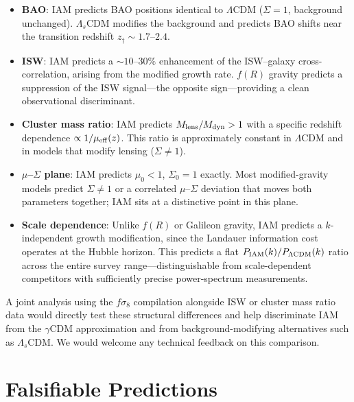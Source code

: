 \documentclass[12pt,a4paper]{article}
\begin{document}
\begin{itemize}
  \item \textbf{BAO}: IAM predicts BAO positions identical to $\Lambda$CDM
    ($\Sigma = 1$, background unchanged).
    $\Lambda_s$CDM modifies the background and predicts BAO shifts
    near the transition redshift $z_\dagger \sim 1.7$--$2.4$.

  \item \textbf{ISW}: IAM predicts a $\sim 10$--$30\%$ enhancement of the
    ISW--galaxy cross-correlation, arising from the modified growth rate.
    $f(R)$ gravity predicts a suppression of the ISW signal---the opposite
    sign---providing a clean observational discriminant.

  \item \textbf{Cluster mass ratio}: IAM predicts $M_{\rm lens}/M_{\rm dyn} > 1$
    with a specific redshift dependence $\propto 1/\mu_{\rm eff}(z)$.
    This ratio is approximately constant in $\Lambda$CDM and in models
    that modify lensing ($\Sigma \neq 1$).

  \item \textbf{$\mu$--$\Sigma$ plane}: IAM predicts $\mu_0 < 1$,
    $\Sigma_0 = 1$ exactly.  Most modified-gravity models predict
    $\Sigma \neq 1$ or a correlated $\mu$--$\Sigma$ deviation that moves
    both parameters together; IAM sits at a distinctive point in this plane.

  \item \textbf{Scale dependence}: Unlike $f(R)$ or Galileon gravity, IAM
    predicts a $k$-independent growth modification, since the Landauer
    information cost operates at the Hubble horizon.  This predicts a flat
    $P_{\rm IAM}(k)/P_{\Lambda\rm CDM}(k)$ ratio across the entire survey
    range---distinguishable from scale-dependent competitors with
    sufficiently precise power-spectrum measurements.
\end{itemize}

A joint analysis using the $f\sigma_8$ compilation alongside ISW or
cluster mass ratio data would directly test these structural differences
and help discriminate IAM from the $\gamma$CDM approximation and from
background-modifying alternatives such as $\Lambda_s$CDM.
We would welcome any technical feedback on this comparison.

\section{Falsifiable Predictions}
\end{document}
